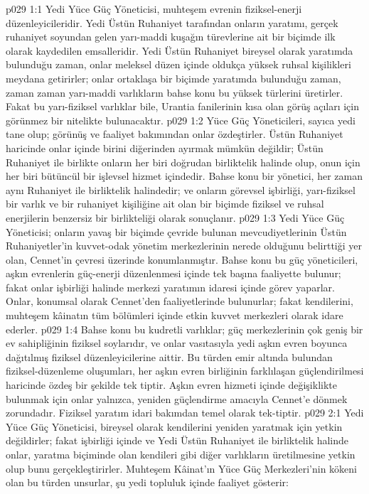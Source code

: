 \vs p029 1:1 Yedi Yüce Güç Yöneticisi, muhteşem evrenin fiziksel\hyp{}enerji düzenleyicileridir. Yedi Üstün Ruhaniyet tarafından onların yaratımı, gerçek ruhaniyet soyundan gelen yarı\hyp{}maddi kuşağın türevlerine ait bir biçimde ilk olarak kaydedilen emsalleridir. Yedi Üstün Ruhaniyet bireysel olarak yaratımda bulunduğu zaman, onlar meleksel düzen içinde oldukça yüksek ruhsal kişilikleri meydana getirirler; onlar ortaklaşa bir biçimde yaratımda bulunduğu zaman, zaman zaman yarı\hyp{}maddi varlıkların bahse konu bu yüksek türlerini üretirler. Fakat bu yarı\hyp{}fiziksel varlıklar bile, Urantia fanilerinin kısa olan görüş açıları için görünmez bir nitelikte bulunacaktır.
\vs p029 1:2 Yüce Güç Yöneticileri, sayıca yedi tane olup; görünüş ve faaliyet bakımından onlar özdeştirler. Üstün Ruhaniyet haricinde onlar içinde birini diğerinden ayırmak mümkün değildir; Üstün Ruhaniyet ile birlikte onların her biri doğrudan birliktelik halinde olup, onun için her biri bütüncül bir işlevsel hizmet içindedir. Bahse konu bir yönetici, her zaman aynı Ruhaniyet ile birliktelik halindedir; ve onların görevsel işbirliği, yarı\hyp{}fiziksel bir varlık ve bir ruhaniyet kişiliğine ait olan bir biçimde fiziksel ve ruhsal enerjilerin benzersiz bir birlikteliği olarak sonuçlanır.
\vs p029 1:3 Yedi Yüce Güç Yöneticisi; onların yavaş bir biçimde çevride bulunan mevcudiyetlerinin Üstün Ruhaniyetler’in kuvvet\hyp{}odak yönetim merkezlerinin nerede olduğunu belirttiği yer olan, Cennet’in çevresi üzerinde konumlanmıştır. Bahse konu bu güç yöneticileri, aşkın evrenlerin güç\hyp{}enerji düzenlenmesi içinde tek başına faaliyette bulunur; fakat onlar işbirliği halinde merkezi yaratımın idaresi içinde görev yaparlar. Onlar, konumsal olarak Cennet’den faaliyetlerinde bulunurlar; fakat kendilerini, muhteşem kâinatın tüm bölümleri içinde etkin kuvvet merkezleri olarak idare ederler.
\vs p029 1:4 Bahse konu bu kudretli varlıklar; güç merkezlerinin çok geniş bir ev sahipliğinin fiziksel soylarıdır, ve onlar vasıtasıyla yedi aşkın evren boyunca dağıtılmış fiziksel düzenleyicilerine aittir. Bu türden emir altında bulundan fiziksel\hyp{}düzenleme oluşumları, her aşkın evren birliğinin farklılaşan güçlendirilmesi haricinde özdeş bir şekilde tek tiptir. Aşkın evren hizmeti içinde değişiklikte bulunmak için onlar yalnızca, yeniden güçlendirme amacıyla Cennet’e dönmek zorundadır. Fiziksel yaratım idari bakımdan temel olarak tek\hyp{}tiptir.
\vs p029 2:1 Yedi Yüce Güç Yöneticisi, bireysel olarak kendilerini yeniden yaratmak için yetkin değildirler; fakat işbirliği içinde ve Yedi Üstün Ruhaniyet ile birliktelik halinde onlar, yaratma biçiminde olan kendileri gibi diğer varlıkların üretilmesine yetkin olup bunu gerçekleştirirler. Muhteşem Kâinat’ın Yüce Güç Merkezleri’nin kökeni olan bu türden unsurlar, şu yedi topluluk içinde faaliyet gösterir:
